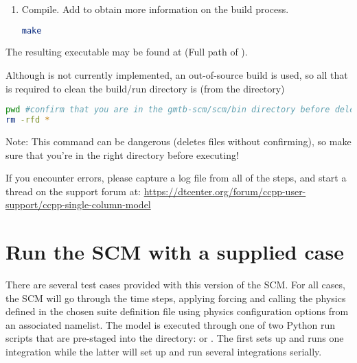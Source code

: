 \begin{enumerate}
If necessary, the CCPP prebuild script can be executed manually from the top level directory (). The basic syntax is
\begin{lstlisting}[language=bash]
./ccpp/framework/scripts/ccpp_prebuild.py --config=./ccpp/config/ccpp_prebuild_config.py --static --suites=SCM_GFS_v15p2,SCM_GFS_v16beta,SCM_GSD_v1[...] --builddir=./scm/bin [--debug]
\end{lstlisting}
where the argument supplied via the  variable is a comma-separated list of suite names that exist in the  directory. Note that suite names are the suite definition filenames minus the  prefix and  suffix.

\item Compile. Add  to obtain more information on the build process.
\begin{lstlisting}[language=bash]
make
\end{lstlisting}
\end{enumerate}

The resulting executable may be found at  (Full path of ).

Although  is not currently implemented, an out-of-source build is used, so all that is required to clean the build/run directory is (from the  directory)
\begin{lstlisting}[language=bash]
pwd #confirm that you are in the gmtb-scm/scm/bin directory before deleting files
rm -rfd *
\end{lstlisting}
Note: This command can be dangerous (deletes files without confirming), so make sure that you're in the right directory before executing!

If you encounter errors, please capture a log file from all of the steps, and start a thread on the support forum at: \url{https://dtcenter.org/forum/ccpp-user-support/ccpp-single-column-model}

\section{Run the SCM with a supplied case}
There are several test cases provided with this version of the SCM. For all cases, the SCM will go through the time steps, applying forcing and calling the physics defined in the chosen suite definition file using physics configuration options from an associated namelist. The model is executed through one of two Python run scripts that are pre-staged into the  directory:  or . The first sets up and runs one integration while the latter will set up and run several integrations serially.

